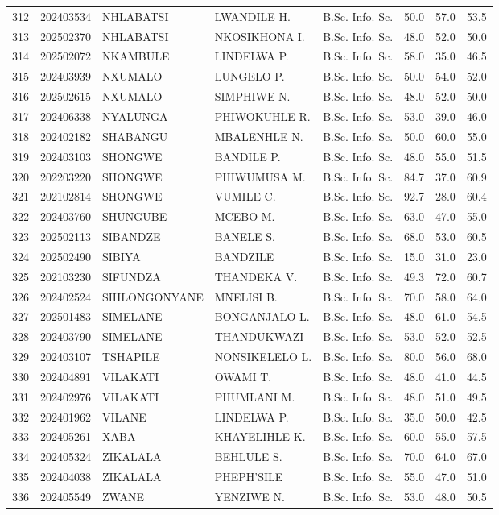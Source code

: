 \documentclass[12pt]{article}
\begin{document}
\begin{longtable}{@{}llllllll@{}}
312 & 202403534 & NHLABATSI & LWANDILE H. & B.Sc. Info. Sc. & 50.0 & 57.0 & 53.5 \\
313 & 202502370 & NHLABATSI & NKOSIKHONA I. & B.Sc. Info. Sc. & 48.0 & 52.0 & 50.0 \\
314 & 202502072 & NKAMBULE & LINDELWA P. & B.Sc. Info. Sc. & 58.0 & 35.0 & 46.5 \\
315 & 202403939 & NXUMALO & LUNGELO P. & B.Sc. Info. Sc. & 50.0 & 54.0 & 52.0 \\
316 & 202502615 & NXUMALO & SIMPHIWE N. & B.Sc. Info. Sc. & 48.0 & 52.0 & 50.0 \\
317 & 202406338 & NYALUNGA & PHIWOKUHLE R. & B.Sc. Info. Sc. & 53.0 & 39.0 & 46.0 \\
318 & 202402182 & SHABANGU & MBALENHLE N. & B.Sc. Info. Sc. & 50.0 & 60.0 & 55.0 \\
319 & 202403103 & SHONGWE & BANDILE P. & B.Sc. Info. Sc. & 48.0 & 55.0 & 51.5 \\
320 & 202203220 & SHONGWE & PHIWUMUSA M. & B.Sc. Info. Sc. & 84.7 & 37.0 & 60.9 \\
321 & 202102814 & SHONGWE & VUMILE C. & B.Sc. Info. Sc. & 92.7 & 28.0 & 60.4 \\
322 & 202403760 & SHUNGUBE & MCEBO M. & B.Sc. Info. Sc. & 63.0 & 47.0 & 55.0 \\
323 & 202502113 & SIBANDZE & BANELE S. & B.Sc. Info. Sc. & 68.0 & 53.0 & 60.5 \\
324 & 202502490 & SIBIYA & BANDZILE & B.Sc. Info. Sc. & 15.0 & 31.0 & 23.0 \\
325 & 202103230 & SIFUNDZA & THANDEKA V. & B.Sc. Info. Sc. & 49.3 & 72.0 & 60.7 \\
326 & 202402524 & SIHLONGONYANE & MNELISI B. & B.Sc. Info. Sc. & 70.0 & 58.0 & 64.0 \\
327 & 202501483 & SIMELANE & BONGANJALO L. & B.Sc. Info. Sc. & 48.0 & 61.0 & 54.5 \\
328 & 202403790 & SIMELANE & THANDUKWAZI & B.Sc. Info. Sc. & 53.0 & 52.0 & 52.5 \\
329 & 202403107 & TSHAPILE & NONSIKELELO L. & B.Sc. Info. Sc. & 80.0 & 56.0 & 68.0 \\
330 & 202404891 & VILAKATI & OWAMI T. & B.Sc. Info. Sc. & 48.0 & 41.0 & 44.5 \\
331 & 202402976 & VILAKATI & PHUMLANI M. & B.Sc. Info. Sc. & 48.0 & 51.0 & 49.5 \\
332 & 202401962 & VILANE & LINDELWA P. & B.Sc. Info. Sc. & 35.0 & 50.0 & 42.5 \\
333 & 202405261 & XABA & KHAYELIHLE K. & B.Sc. Info. Sc. & 60.0 & 55.0 & 57.5 \\
334 & 202405324 & ZIKALALA & BEHLULE S. & B.Sc. Info. Sc. & 70.0 & 64.0 & 67.0 \\
335 & 202404038 & ZIKALALA & PHEPH'SILE & B.Sc. Info. Sc. & 55.0 & 47.0 & 51.0 \\
336 & 202405549 & ZWANE & YENZIWE N. & B.Sc. Info. Sc. & 53.0 & 48.0 & 50.5 \\


\end{longtable}
\end{document}
